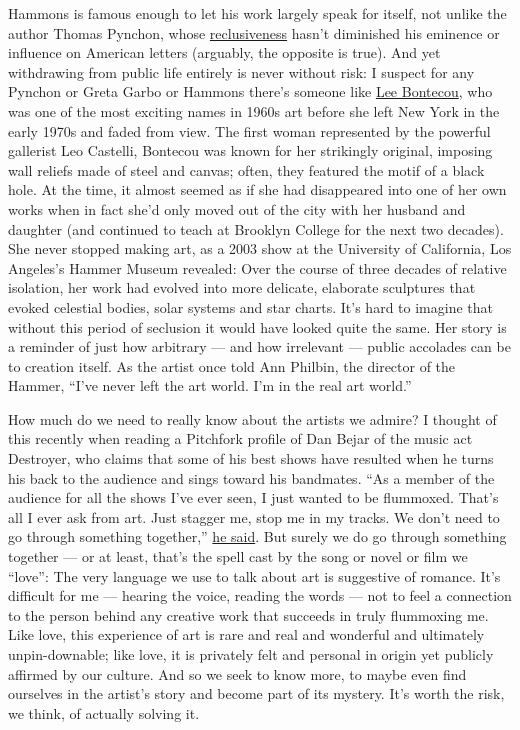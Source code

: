 Hammons is famous enough to let his work largely speak for itself, not
unlike the author Thomas Pynchon, whose
\href{https://www.nytimes3xbfgragh.onion/2017/11/14/t-magazine/artistic-recluse-jd-salinger-thomas-pynchon.html}{reclusiveness}
hasn't diminished his eminence or influence on American letters
(arguably, the opposite is true). And yet withdrawing from public life
entirely is never without risk: I suspect for any Pynchon or Greta Garbo
or Hammons there's someone like
\href{https://www.moma.org/artists/670}{Lee Bontecou}, who was one of
the most exciting names in 1960s art before she left New York in the
early 1970s and faded from view. The first woman represented by the
powerful gallerist Leo Castelli, Bontecou was known for her strikingly
original, imposing wall reliefs made of steel and canvas; often, they
featured the motif of a black hole. At the time, it almost seemed as if
she had disappeared into one of her own works when in fact she'd only
moved out of the city with her husband and daughter (and continued to
teach at Brooklyn College for the next two decades). She never stopped
making art, as a 2003 show at the University of California, Los
Angeles's Hammer Museum revealed: Over the course of three decades of
relative isolation, her work had evolved into more delicate, elaborate
sculptures that evoked celestial bodies, solar systems and star charts.
It's hard to imagine that without this period of seclusion it would have
looked quite the same. Her story is a reminder of just how arbitrary ---
and how irrelevant --- public accolades can be to creation itself. As
the artist once told Ann Philbin, the director of the Hammer, ``I've
never left the art world. I'm in the real art world.''

How much do we need to really know about the artists we admire? I
thought of this recently when reading a Pitchfork profile of Dan Bejar
of the music act Destroyer, who claims that some of his best shows have
resulted when he turns his back to the audience and sings toward his
bandmates. ``As a member of the audience for all the shows I've ever
seen, I just wanted to be flummoxed. That's all I ever ask from art.
Just stagger me, stop me in my tracks. We don't need to go through
something together,''
\href{https://pitchfork.com/features/profile/destroyer-dan-bejar-have-we-met-interview/}{he
said}. But surely we do go through something together --- or at least,
that's the spell cast by the song or novel or film we ``love'': The very
language we use to talk about art is suggestive of romance. It's
difficult for me --- hearing the voice, reading the words --- not to
feel a connection to the person behind any creative work that succeeds
in truly flummoxing me. Like love, this experience of art is rare and
real and wonderful and ultimately unpin-downable; like love, it is
privately felt and personal in origin yet publicly affirmed by our
culture. And so we seek to know more, to maybe even find ourselves in
the artist's story and become part of its mystery. It's worth the risk,
we think, of actually solving it.

